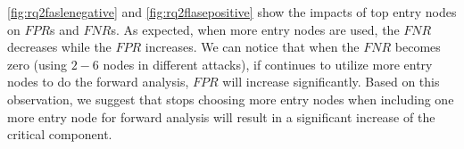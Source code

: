 \cref{fig:rq2faslenegative} and \cref{fig:rq2flasepositive} show the impacts of top entry nodes on $FPR$s and $FNR$s.
As expected, when more entry nodes are used, the $FNR$ decreases while the $FPR$ increases. 
We can notice that when the $FNR$ becomes zero  (using $2-6$ nodes in different attacks), if \tool continues to utilize more entry nodes to do the forward analysis, $FPR$ will increase significantly.
Based on this observation, we suggest that \tool stops choosing more entry nodes when including one more entry node for forward analysis will result in a significant increase of the critical component.




